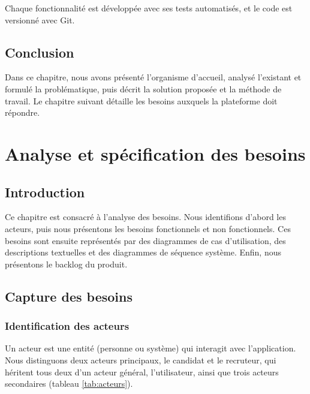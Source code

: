 \documentclass[12pt,a4paper]{report}
\newcommand{\plan}{%
  \begingroup
  \etocsettocstyle{\vspace{1.5cm}\noindent{\large\bfseries Plan}\par\vspace{6pt}}{}%
  \etocsetstyle{section}{}{}%
    {\noindent\hspace*{2em}\makebox[2.5em][l]{\small\bfseries\etocnumber}%
     {\small\bfseries\etocname}\dotfill{\small\bfseries\etocpage}\par}{}%
  \etocsetnexttocdepth{section}%
  \localtableofcontents
  \endgroup
  \clearpage}
\begin{document}
Chaque fonctionnalité est développée avec ses tests automatisés, et le code est versionné avec Git.

\section*{Conclusion}
Dans ce chapitre, nous avons présenté l'organisme d'accueil, analysé l'existant et formulé la problématique, puis décrit la solution proposée et la méthode de travail. Le chapitre suivant détaille les besoins auxquels la plateforme doit répondre.

\chapter{Analyse et spécification des besoins}
\plan

\section*{Introduction}
Ce chapitre est consacré à l'analyse des besoins. Nous identifions d'abord les acteurs, puis nous présentons les besoins fonctionnels et non fonctionnels. Ces besoins sont ensuite représentés par des diagrammes de cas d'utilisation, des descriptions textuelles et des diagrammes de séquence système. Enfin, nous présentons le backlog du produit.

\section{Capture des besoins}

\subsection{Identification des acteurs}
Un acteur est une entité (personne ou système) qui interagit avec l'application. Nous distinguons deux acteurs principaux, le candidat et le recruteur, qui héritent tous deux d'un acteur général, l'utilisateur, ainsi que trois acteurs secondaires (tableau \ref{tab:acteurs}).
\end{document}
